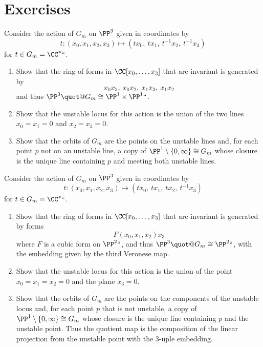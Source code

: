 \section{Exercises}

\begin{exercise}
Consider the action of $G_m$ on $\PP^3$ given in coordinates by
$$t: (x_0,x_1,x_2,x_3) \mapsto (tx_0,\ tx_1,\ t^{-1}x_2,\ t^{-1}x_3)
$$
for $t\in G_m = \CC^*` `$.
\begin{enumerate}
 \item Show that the ring  of forms in $\CC[x_0, \dots, x_3]$ that are 
invariant
%
is generated by
$$
x_0x_3, \ x_0x_2,\ x_1x_3,\ x_1x_2
$$
and thus $\PP^3\quot @G_m\cong \PP^1\times \PP^1` `$.
\item Show that the 
unstable locus
%
for this action is the union of the two lines $x_0=x_1=0$ and
$x_2=x_3=0$.
\item Show that the orbits of $G_m$ are the points on the unstable lines and, for each
point $p$ not on an unstable line, a copy of
$\PP^1\setminus \{0,\infty\}\cong G_m$ whose closure is the unique line containing $p$ and
meeting both unstable lines.
\end{enumerate}
\end{exercise}

\begin{exercise}
Consider the action of $G_m$ on $\PP^3$ given in coordinates by
$$t: (x_0,x_1,x_2,x_3) \mapsto (tx_0,\ tx_1,\ tx_2,\ t^{-1}x_3)
$$
for $t\in G_m = \CC^*` `$.
\begin{enumerate}
 \item Show that the ring  of forms in $\CC[x_0, \dots, x_3]$ that are invariant is generated by
 forms
%
$$
F(x_0,  x_1, x_2)x_3
$$
where $F$ is a cubic form on $\PP^2` `$, and thus
$\PP^3\quot@G_m\cong \PP^2` `$, with the embedding given by the 
third Veronese map.
%
\item Show that the unstable locus for this action is the union of the point  $x_0=x_1=x_2 = 0$ and
%
the plane $x_3=0$.
\item Show that the orbits of $G_m$ are the points on the components of the unstable locus and, for each
point $p$ that is not unstable, a copy of
$\PP^1\setminus \{0,\infty\}\cong G_m$ whose closure is the unique line containing $p$ and the unstable
point. Thus the quotient map is the composition of the linear projection from the unstable point with the 3-uple
embedding.
\end{enumerate}
\end{exercise}

